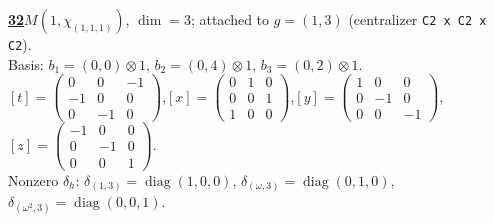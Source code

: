 \begin{samepage}\noindent\textbf{\underline{32}}\quad $M(1,\chi_{(1,1,1)})$, $\dim=3$; attached to $g=(1,3)$ (centralizer \texttt{C2 x C2 x C2}).\\
Basis: $b_{1}=(0,0)\otimes 1$, $b_{2}=(0,4)\otimes 1$, $b_{3}=(0,2)\otimes 1$.\\
$[t]=\left(\begin{smallmatrix} 0 & 0 & -1 \\ -1 & 0 & 0 \\ 0 & -1 & 0 \end{smallmatrix}\right)$,\quad $[x]=\left(\begin{smallmatrix} 0 & 1 & 0 \\ 0 & 0 & 1 \\ 1 & 0 & 0 \end{smallmatrix}\right)$,\quad $[y]=\left(\begin{smallmatrix} 1 & 0 & 0 \\ 0 & -1 & 0 \\ 0 & 0 & -1 \end{smallmatrix}\right)$,\quad $[z]=\left(\begin{smallmatrix} -1 & 0 & 0 \\ 0 & -1 & 0 \\ 0 & 0 & 1 \end{smallmatrix}\right)$.\\
Nonzero $\delta_h$: $\delta_{(1,3)}=\operatorname{diag}(1,0,0)$, $\delta_{(\omega,3)}=\operatorname{diag}(0,1,0)$, $\delta_{(\omega^2,3)}=\operatorname{diag}(0,0,1)$.\end{samepage}
\medskip


